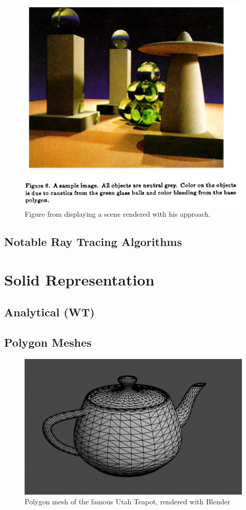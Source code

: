 \begin{figure}
	\centering
	\includegraphics[width=.75\linewidth]{img/1 fundamentals/rendering_eq_figure.png}
	\caption{Figure from \cite{kajiya1986rendering} displaying a scene rendered with his approach.}
	\label{fig:rendering_eq}
\end{figure}


\subsection{Notable Ray Tracing Algorithms}

\section{Solid Representation}

\subsection{Analytical (WT)}

\subsection{Polygon Meshes}

\begin{figure}
	\centering
	\includegraphics[width=.8\linewidth]{img/1 fundamentals/poly_mesh.png}
	\caption{Polygon mesh of the famous Utah Teapot, rendered with Blender \cite{blender2018}}
	\label{fig:poly_mesh}
\end{figure}

